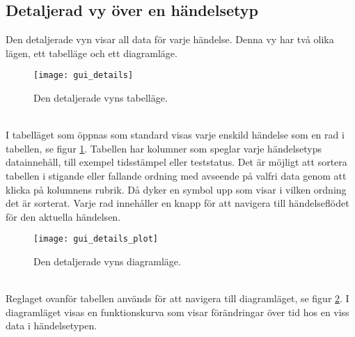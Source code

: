 \subsection{Detaljerad vy över en händelsetyp}
Den detaljerade vyn visar all data för varje händelse. Denna vy har två olika lägen, ett tabelläge och ett diagramläge. 
\begin{figure}[H]
  \centering
  \texttt{[image: gui\_details]}
  \caption{Den detaljerade vyns tabelläge.}
  \label{fig:gui_details}
\end{figure}
\ \\
I tabelläget som öppnas som standard visas varje enskild händelse som en rad i tabellen, se figur \ref{fig:gui_details}. Tabellen har kolumner som speglar varje händelsetyps datainnehåll, till exempel tidsstämpel eller teststatus. Det är möjligt att sortera tabellen i stigande eller fallande ordning med avseende på valfri data genom att klicka på kolumnens rubrik. Då dyker en symbol upp som visar i vilken ordning det är sorterat. Varje rad innehåller en knapp för att navigera till händelseflödet för den aktuella händelsen.
\begin{figure}[H]
  \centering
  \texttt{[image: gui\_details\_plot]}
  \caption{Den detaljerade vyns diagramläge.}
  \label{fig:gui_details_plot}
\end{figure}
\ \\
Reglaget ovanför tabellen används för att navigera till diagramläget, se figur \ref{fig:gui_details_plot}. I diagramläget visas en funktionskurva som visar förändringar över tid hos en viss data i händelsetypen.

